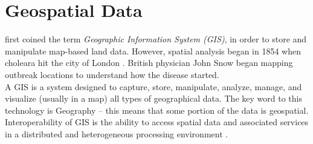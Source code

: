 \documentclass[12pt,a4paper]{report}
\newcommand{\term}{\textit}
\newcommand{\acr}{\MakeUppercase}
\begin{document}
	\section{Geospatial Data}
	\label{sec:fed_geodata:geodata}

	\citet{Tomlinson} first coined the term \term{Geographic Information System 
	(\acr{gis})}, in order to store and manipulate map-based land data. However, 
	spatial analysis began in 1854 when choleara hit the city of London 
	\citep{whatIsGis}. British physician John Snow began mapping outbreak 
	locations to understand how the disease started.
	\\

	A \acr{gis} is a system designed to capture, store, manipulate, analyze, 
	manage, and visualize (usually in a map) all types of geographical data. 
	The key word to this technology is Geography – this means that some portion 
	of the data is geospatial. Interoperability of \acr{gis} is the ability to 
	access spatial data and associated services in a distributed and 
	heterogeneous processing environment \citep{Gong}. 
	\\
\end{document}
